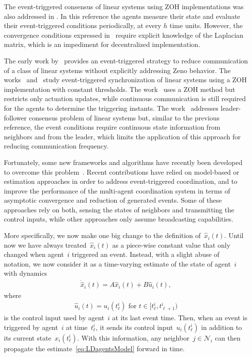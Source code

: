 \documentclass{autart}
\newcommand{\NN}{{\mathcal{N}}}
\renewcommand{\hat}{\widehat}
\begin{document}
The event-triggered consensus of linear systems using ZOH
implementations was also addressed in \cite{GG-LD-QH:14}. In this
reference the agents measure their state and evaluate their
event-triggered conditions periodically, at every $h$ time
units. However, the convergence conditions expressed
in~\cite{GG-LD-QH:14} require explicit knowledge of the Laplacian
matrix, which is an impediment for decentralized implementation.

The early work by~\cite{TL-DJH-BL:12} provides an event-triggered
strategy to reduce communication of a class of linear systems without
explicitly addressing Zeno behavior.  The works~\cite{OD-JL:12a}
and~\cite{OD-JL:12b} study event-triggered synchronization of linear
systems using a ZOH implementation with constant thresholds. The
work~\cite{ZZ-FH-LZ-LW:14} uses a ZOH method but restricts only
actuation updates, while continuous communication is still required
for the agents to determine the triggering instants. The
work~\cite{BZ-XL-TH-GC:15} addresses leader-follower consensus problem
of linear systems but, similar to the previous reference, the event
conditions require continuous state information from neighbors and
from the leader, which limits the application of this approach for
reducing communication frequency.

Fortunately, some new frameworks and algorithms have recently been
developed to overcome this
problem~\citep{NM-XL-TH:15b,DD-ZW-BS-GW:15,DY-WR-XL:14,DY-XL-WC:15,DY-WR-XL-WC:16,EG-YC-DWC:14,QL-ZW-XH-DHZ:15,EG-YC-DWC:17,HZ-GF-HY-QC:14,CDP:13}. Recent
contributions have relied on model-based or estimation approaches in
order to address event-triggered coordination, and to
improve the performance of the multi-agent coordination system in
terms of asymptotic convergence and reduction of generated
events. Some of these approaches rely on both, sensing the states of
neighbors and transmitting the control inputs, while other approaches
only assume broadcasting capabilities.

More specifically, we now make one big change to the definition
of~$\hat{x}_i(t)$. Until now we have always treated~$\hat{x}_i(t)$ as
a piece-wise constant value that only changed when agent~$i$ triggered
an event. Instead, with a slight abuse of notation, we now consider it
as a time-varying estimate of the state of agent~$i$ with dynamics
\begin{align}\label{eq:LDagentsModel}
  \dot{\hat{x}}_i(t)=A\hat{x}_i(t)+B\hat{u}_i(t),
\end{align}
where
\begin{align}
  \hat{u}_i(t) = u_i(t_\ell^i) \text{ for } t \in [t_\ell^i,t_{\ell+1}^i)
\end{align}
is the control input used by agent~$i$ at its last event time. Then,
when an event is triggered by agent~$i$ at time~$t_\ell^i$, it sends
its control input~$u_i(t_\ell^i)$ in addition to its current
state~$x_i(t_\ell^i)$. With this information, any
neighbor~$j \in \NN_i$ can then propagate the
estimate~\eqref{eq:LDagentsModel} forward in time.
\end{document}
